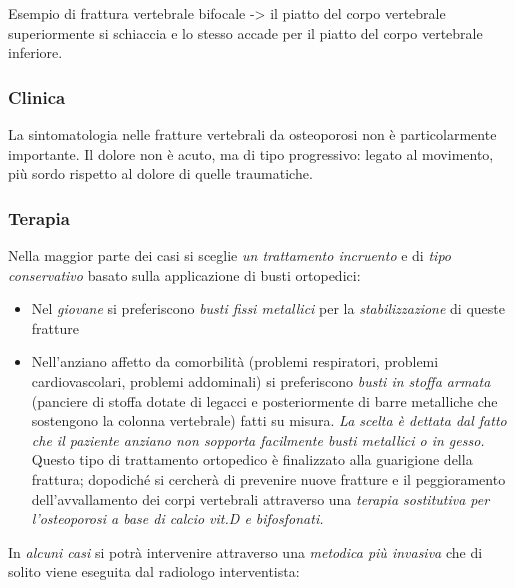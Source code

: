 Esempio di frattura vertebrale bifocale -> il piatto del corpo vertebrale superiormente si schiaccia e lo stesso accade per il piatto del corpo vertebrale inferiore.

\subsubsection{Clinica}

La sintomatologia nelle fratture vertebrali da osteoporosi non è particolarmente importante. Il dolore non è acuto, ma di tipo progressivo: legato al movimento, più sordo rispetto al dolore di quelle
traumatiche.

\subsubsection{Terapia}

Nella maggior parte dei casi si sceglie \emph{un trattamento incruento} e di \emph{tipo conservativo} basato sulla applicazione di busti ortopedici:

\begin{itemize}
\item
  Nel \emph{giovane} si preferiscono \emph{busti fissi metallici} per la \emph{stabilizzazione} di queste fratture
\item
  Nell'anziano affetto da comorbilità (problemi respiratori, problemi cardiovascolari, problemi addominali) si preferiscono \emph{busti in stoffa armata} (panciere di stoffa dotate di legacci e posteriormente di barre metalliche che sostengono la colonna vertebrale) fatti su misura. \emph{La scelta è dettata dal fatto che il paziente anziano non sopporta facilmente busti metallici o in gesso.} Questo tipo di trattamento ortopedico è finalizzato alla guarigione della frattura; dopodiché si cercherà di prevenire nuove fratture e il peggioramento dell'avvallamento dei corpi vertebrali attraverso una \emph{terapia sostitutiva per l'osteoporosi a base di calcio vit.D e bifosfonati.}
\end{itemize}

In \emph{alcuni casi} si potrà intervenire attraverso una \emph{metodica
più invasiva} che di solito viene eseguita dal radiologo interventista:

